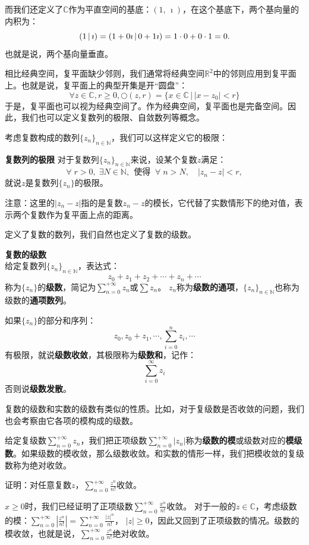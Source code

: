 \documentclass[12pt,UTF8]{ctexbook}
\begin{document}
而我们还定义了$\mathbb{C}$作为平直空间的基底：$(1,\, \imath)$，在这个基底下，两个基向量的内积为：
$$ \displaystyle\left( 1 \,|\, \imath \right) = \displaystyle\left( 1 + 0\imath \,|\, 0 + 1\imath \right) = 1\cdot 0 + 0\cdot 1 = 0.$$
也就是说，两个基向量垂直。

相比经典空间，复平面缺少邻则，我们通常将经典空间$\mathbb{R}^2$中的邻则应用到复平面上。也就是说，复平面上的典型开集是开“圆盘”：
$$ \forall z \in \mathbb{C}, r\geqslant 0,  \bigcirc(z, r) = \{x \in \mathbb{C} \, | \, |x - z_0| < r \} $$
于是，复平面也可以视为经典空间了。作为经典空间，复平面也是完备空间。因此，我们也可以定义复数列的极限、自敛数列等概念。

考虑复数构成的数列$\{z_n\}_{n\in\mathbb{N}}$，我们可以这样定义它的极限：
\begin{df}{\textbf{复数列的极限}}
    对于复数列$\{z_n\}_{n\in\mathbb{N}}$来说，设某个复数$z$满足：
    $$ \forall \;r > 0 ,\; \exists N\in \mathbb{N},\;\, \mbox{使得}\;\; \forall \; n>N, \quad | z_n - z | < r, $$
    就说$z$是复数列$\{z_n\}$的极限。

\end{df}

注意：这里的$|z_n - z|$指的是复数$z_n - z$的模长，它代替了实数情形下的绝对值，表示两个复数作为复平面上点的距离。

定义了复数的数列，我们自然也定义了复数的级数。
\begin{df}{\textbf{复数的级数}}
    \mbox{} \\
    给定复数列$\{z_n\}_{n\in\mathbb{N}}$，表达式：
    $$ z_0 + z_1 + z_2 + \cdots + z_n + \cdots $$
    称为$\{z_n\}$的\textbf{级数}，简记为$\sum_{n=0}^{+\infty} z_n$或$\sum z_n$。
    $z_n$称为\textbf{级数的通项}，$\{z_n\}_{n\in\mathbb{N}}$也称为级数的\textbf{通项数列}。
    
    如果$\{z_n\}$的部分和序列：
    $$ z_0, z_0 + z_1, \cdots , \sum_{i=0}^n z_i, \cdots $$
    有极限，就说\textbf{级数收敛}，其极限称为\textbf{级数和}，记作：
    $$ \sum_{i=0}^\infty z_i $$
    否则说\textbf{级数发散}。
    
\end{df}

复数的级数和实数的级数有类似的性质。比如，对于复级数是否收敛的问题，我们也会考察由它各项的模构成的级数。

给定复级数$\sum_{n=0}^{+\infty} z_n$，我们把正项级数$\sum_{n=0}^{+\infty} |z_n|$称为\textbf{级数的模}或级数对应的\textbf{模级数}。如果级数的模收敛，那么级数收敛。和实数的情形一样，我们把模收敛的复级数称为绝对收敛。

\begin{et}
    证明：对任意复数$z$，$\sum_{n=0}^{+\infty}\frac{z^{n}}{n!}$收敛。
\end{et}
\begin{so}
    $x\geqslant 0$时，我们已经证明了正项级数$\sum_{n=0}^{+\infty}\frac{x^{n}}{n!}$收敛。
    对于一般的$z\in\mathbb{C}$，考虑级数的模：$\sum_{n=0}^{+\infty}\left|\frac{z^{n}}{n!}\right| = \sum_{n=0}^{+\infty}\frac{|z|^{n}}{n!}$，
    $|z|\geqslant 0$，因此又回到了正项级数的情况。级数的模收敛，也就是说，$\sum_{n=0}^{+\infty}\frac{z^{n}}{n!}$绝对收敛。
\end{so}
\end{document}
